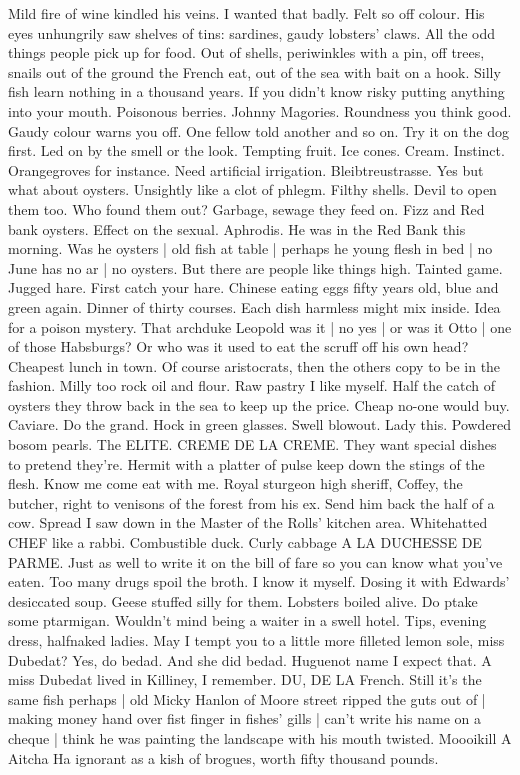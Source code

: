 Mild fire of wine kindled his veins.
I wanted that badly.
Felt so off colour.
His eyes unhungrily saw shelves of tins:
sardines, gaudy lobsters' claws.
All the odd things people pick up for food.
Out of shells,
periwinkles with a pin,
off trees,
snails out of the ground the French eat,
out of the sea with bait on a hook.
Silly fish learn nothing in a thousand years.
If you didn't know risky putting anything into your mouth.
Poisonous berries.
Johnny Magories.
Roundness you think good.
Gaudy colour warns you off.
One fellow told another and so on.
Try it on the dog first.
Led on by the smell or the look.
Tempting fruit.
Ice cones.
Cream.
Instinct.
Orangegroves for instance.
Need artificial irrigation.
Bleibtreustrasse.
Yes but what about oysters.
Unsightly like a clot of phlegm.
Filthy shells.
Devil to open them too.
Who found them out?
Garbage, sewage they feed on.
Fizz and Red bank oysters.
Effect on the sexual.
Aphrodis.
He was in the Red Bank this morning.
Was he oysters |
old fish at table |
perhaps he young flesh in bed |
no June has no ar |
no oysters.
But there are people like things high.
Tainted game.
Jugged hare.
First catch your hare.
Chinese eating eggs fifty years old,
blue and green again.
Dinner of thirty courses.
Each dish harmless might mix inside.
Idea for a poison mystery.
That archduke Leopold was it |
no yes |
or was it Otto |
one of those Habsburgs?
Or who was it used to eat the scruff off his own head?
Cheapest lunch in town.
Of course aristocrats,
then the others copy to be in the fashion.
Milly too rock oil and flour.
Raw pastry I like myself.
Half the catch of oysters they throw back in the sea to keep up the price.
Cheap no-one would buy.
Caviare.
Do the grand.
Hock in green glasses.
Swell blowout.
Lady this.
Powdered bosom pearls.
The ELITE.
CREME DE LA CREME.
They want special dishes to pretend they're.
Hermit with a platter of pulse keep down the stings of the flesh.
Know me come eat with me.
Royal sturgeon high sheriff,
Coffey, the butcher,
right to venisons of the forest from his ex.
Send him back the half of a cow.
Spread I saw down in the Master of the Rolls' kitchen area.
Whitehatted CHEF like a rabbi.
Combustible duck.
Curly cabbage A LA DUCHESSE DE PARME.
Just as well to write it on the bill of fare so you can know what you've eaten.
Too many drugs spoil the broth.
I know it myself.
Dosing it with Edwards' desiccated soup.
Geese stuffed silly for them.
Lobsters boiled alive.
Do ptake some ptarmigan.
Wouldn't mind being a waiter in a swell hotel.
Tips,
evening dress,
halfnaked ladies.
May I tempt you to a little more filleted lemon sole,
miss Dubedat?
Yes, do bedad.
And she did bedad.
Huguenot name I expect that.
A miss Dubedat lived in Killiney,
I remember.
DU, DE LA
French.
Still it's the same fish perhaps |
old Micky Hanlon of Moore street ripped the guts out of |
making money hand over fist finger in fishes' gills |
can't write his name on a cheque |
think he was painting the landscape with his mouth twisted.
Moooikill A Aitcha Ha ignorant as a kish of brogues,
worth fifty thousand pounds.


